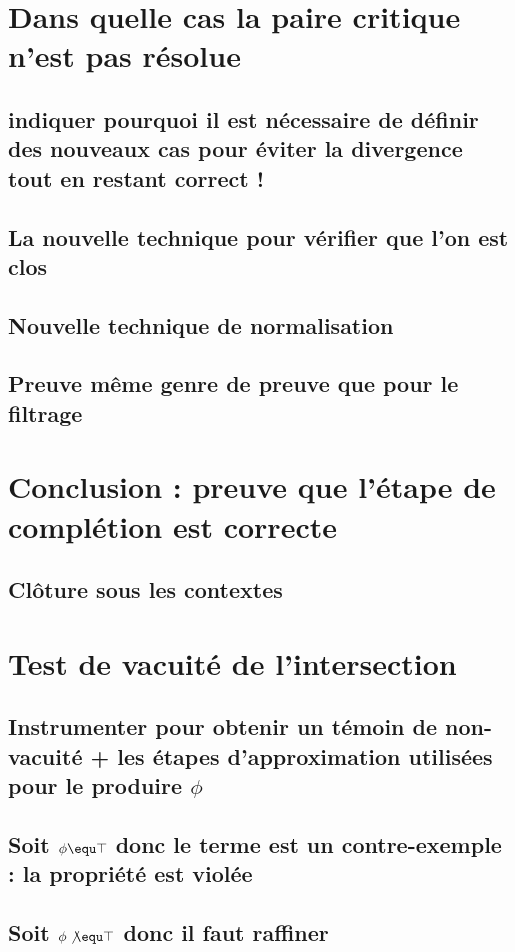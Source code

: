 \section{Dans quelle cas la paire critique n'est pas résolue}
\subsection{indiquer pourquoi il est nécessaire de définir des nouveaux cas pour éviter la divergence tout en restant correct !}
\subsection{La nouvelle technique pour vérifier que l'on est clos}
\subsection{Nouvelle technique de normalisation}
\subsection{Preuve même genre de preuve que pour le filtrage}

\section{Conclusion : preuve que l'étape de complétion est correcte}
\subsection{Clôture sous les contextes}


\section{Test de vacuité de l'intersection}
\subsection{Instrumenter pour obtenir un témoin de non-vacuité + les étapes d'approximation utilisées pour le produire $\phi$}
\subsection{Soit $\phi \equ \top$ donc le terme est un contre-exemple : la propriété est violée}
\subsection{Soit $\phi \not\equ \top$ donc il faut raffiner}

